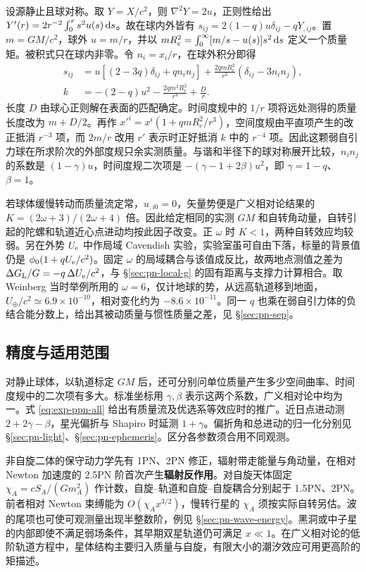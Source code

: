 设源静止且球对称。取 $Y=X/c^2$，则 $\nabla^2Y=2u$，正则性给出 $Y'(r)=2r^{-2}\int_0^r s^2u(s)\,\dd s$。故在球内外皆有 $s_{ij}=2(1-q)u\delta_{ij}-qY_{,ij}$。置 $m=GM/c^2$，球外 $u=m/r$，并以 $mR_e^2=\int_0^\infty[m/s-u(s)]s^2\,\dd s$ 定义一个质量矩。被积式只在球内非零。令 $n_i=x_i/r$，在球外积分即得
\begin{align*}
 s_{ij}&=u[(2-3q)\delta_{ij}+q n_i n_j]
       +\frac{2q mR_e^2}{r^3}(\delta_{ij}-3n_i n_j),\\
 k&=-(2-q)u^2-\frac{2q m^2R_e^2}{r^4}+\frac{D}{r} .
\end{align*}
长度 $D$ 由球心正则解在表面的匹配确定。时间度规中的 $1/r$ 项将远处测得的质量长度改为 $m+D/2$。再作 $x'^i=x^i(1+qmR_e^2/r^3)$，空间度规由平直项产生的改正抵消 $r^{-3}$ 项，而 $2m/r$ 改用 $r'$ 表示时正好抵消 $k$ 中的 $r^{-4}$ 项。因此这颗弱自引力球在所求阶次的外部度规只余实测质量。与谐和半径下的球对称展开比较，$n_i n_j$ 的系数是 $(1-\gamma)u$，时间度规二次项是 $-(\gamma-1+2\beta)u^2$，即 $\gamma=1-q$、$\beta=1$。

若球体缓慢转动而质量流定常，$u_{,i0}=0$，矢量势便是广义相对论结果的 $K=(2\omega+3)/(2\omega+4)$ 倍。因此给定相同的实测 $GM$ 和自转角动量，自转引起的陀螺和轨道近心点进动均按此因子改变。正 $\omega$ 时 $K<1$，两种自转效应均较弱。另在外势 $U_{\rm e}$ 中作局域 Cavendish 实验，实验室虽可自由下落，标量的背景值仍是 $\phi_0(1+qU_{\rm e}/c^2)$。固定 $\omega$ 的局域耦合与该值成反比，故两地点测值之差为 $\Delta G_{\rm L}/G=-q\,\Delta U_{\rm e}/c^2$，与 \S\ref{sec:pn-local-g} 的固有距离与支撑力计算相合。取 Weinberg 当时举例所用的 $\omega=6$，仅计地球的势，从远高轨道移到地面，$U_\oplus/c^2\simeq6.9\times10^{-10}$，相对变化约为 $-8.6\times10^{-11}$。同一 $q$ 也乘在弱自引力体的负结合能分数上，给出其被动质量与惯性质量之差，见 \S\ref{sec:pn-sep}。

\subsection{精度与适用范围}

对静止球体，以轨道标定 $GM$ 后，还可分别问单位质量产生多少空间曲率、时间度规中的二次项有多大。标准坐标用 $\gamma,\beta$ 表示这两个系数，广义相对论中均为一。式 \eqref{eq:exp-ppn-all} 给出有质量流及优选系等效应时的推广。近日点进动测 $2+2\gamma-\beta$，星光偏折与 Shapiro 时延测 $1+\gamma$。偏折角和总进动的归一化分别见 \S\ref{sec:pn-light}、\S\ref{sec:pn-ephemeris}。区分各参数须合用不同观测。

非自旋二体的保守动力学先有 1PN、2PN 修正，辐射带走能量与角动量，在相对 Newton 加速度的 2.5PN 阶首次产生\textbf{辐射反作用}。对自旋天体固定 $\chi_A=cS_A/(Gm_A^2)$ 作计数，自旋--轨道和自旋--自旋耦合分别起于 1.5PN、2PN。前者相对 Newton 束缚能为 $O(\chi_A x^{3/2})$，慢转行星的 $\chi_A$ 须按实际自转另估。波的尾项也可使可观测量出现半整数阶，例见 \S\ref{sec:pn-wave-energy}。黑洞或中子星的内部即使不满足弱场条件，其早期双星轨道仍可满足 $x\ll1$。在广义相对论的低阶轨道方程中，星体结构主要归入质量与自旋，有限大小的潮汐效应可用更高阶的矩描述。


